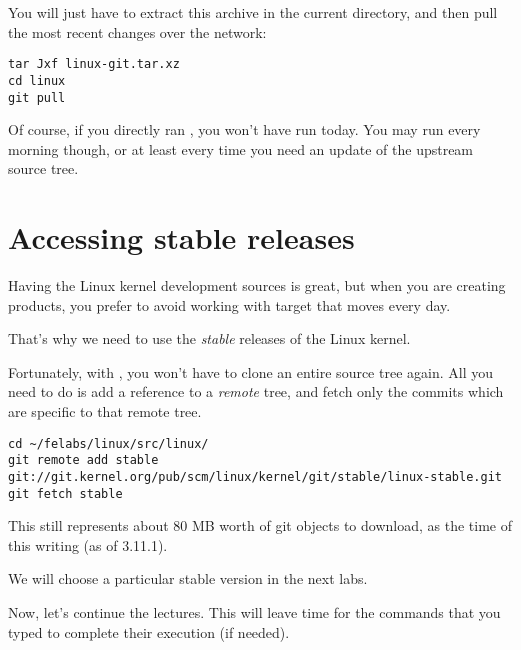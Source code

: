 You will just have to extract this archive in the current directory,
and then pull the most recent changes over the network:

\begin{verbatim}
tar Jxf linux-git.tar.xz
cd linux
git pull
\end{verbatim}

Of course, if you directly ran , you won't have run 
 today. You may run  every morning though,
or at least every time you need an update of the upstream source tree.

\section{Accessing stable releases}

Having the Linux kernel development sources is great, but when you are 
creating products, you prefer to avoid working with target that moves
every day.

That's why we need to use the {\em stable} releases of the Linux
kernel.

Fortunately, with , you won't have to clone an entire source
tree again. All you need to do is add a reference to a {\em remote}
tree, and fetch only the commits which are specific to that remote tree.

{\footnotesize
\begin{verbatim}
cd ~/felabs/linux/src/linux/
git remote add stable git://git.kernel.org/pub/scm/linux/kernel/git/stable/linux-stable.git
git fetch stable
\end{verbatim}
}

This still represents about 80 MB worth of git objects to download, as
the time of this writing (as of 3.11.1).

We will choose a particular stable version in the next labs.

Now, let's continue the lectures. This will leave time for the commands
that you typed to complete their execution (if needed).
